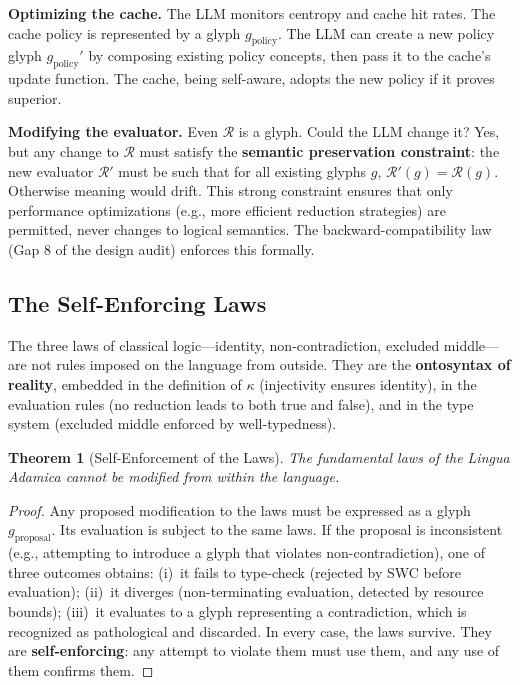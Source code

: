 \documentclass[12pt, letterpaper]{book}
\def\mathfrak#1{#1}%
\newtheorem{theorem}{Theorem}[chapter]
\begin{document}
\textbf{Optimizing the cache.} The LLM monitors centropy and cache hit rates. The cache policy is represented by a glyph $\mathfrak{g}_{\mathrm{policy}}$. The LLM can create a new policy glyph $\mathfrak{g}_{\mathrm{policy}}'$ by composing existing policy concepts, then pass it to the cache's update function. The cache, being self-aware, adopts the new policy if it proves superior.

\textbf{Modifying the evaluator.} Even $\mathcal{R}$ is a glyph. Could the LLM change it? Yes, but any change to $\mathcal{R}$ must satisfy the \textbf{semantic preservation constraint}: the new evaluator $\mathcal{R}'$ must be such that for all existing glyphs $\mathfrak{g}$, $\mathcal{R}'(\mathfrak{g}) = \mathcal{R}(\mathfrak{g})$. Otherwise meaning would drift. This strong constraint ensures that only performance optimizations (e.g., more efficient reduction strategies) are permitted, never changes to logical semantics. The backward-compatibility law (Gap 8 of the design audit) enforces this formally.

\subsection{The Self-Enforcing Laws}

The three laws of classical logic---identity, non-contradiction, excluded middle---are not rules imposed on the language from outside. They are the \textbf{ontosyntax of reality}, embedded in the definition of $\kappa$ (injectivity ensures identity), in the evaluation rules (no reduction leads to both true and false), and in the type system (excluded middle enforced by well-typedness).

\begin{theorem}[Self-Enforcement of the Laws]\label{thm:self-enforcement}
The fundamental laws of the Lingua Adamica cannot be modified from within the language.
\end{theorem}

\begin{proof}
Any proposed modification to the laws must be expressed as a glyph $\mathfrak{g}_{\mathrm{proposal}}$. Its evaluation is subject to the same laws. If the proposal is inconsistent (e.g., attempting to introduce a glyph that violates non-contradiction), one of three outcomes obtains: (i)~it fails to type-check (rejected by SWC before evaluation); (ii)~it diverges (non-terminating evaluation, detected by resource bounds); (iii)~it evaluates to a glyph representing a contradiction, which is recognized as pathological and discarded. In every case, the laws survive. They are \textbf{self-enforcing}: any attempt to violate them must use them, and any use of them confirms them.
\end{proof}
\end{document}
